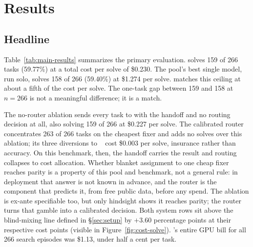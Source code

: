 \section{Results}
\label{sec:results}

\subsection{Headline}
\label{sec:results-headline}

\begin{table}[!tbp]
\centering
\caption{\textbf{Main results on SWE-bench Pro (Python-266).}
\sysname matches the pool's best single model (\fxopus) at about a fifth
of its cost per solve; 159 versus 158 is a one-task gap at $n{=}266$, a
match, not a win.  The last row is the no-router ablation, which ties
the routed system on this benchmark (\S\ref{sec:results-headline}).}
\label{tab:main-results}

\end{table}

Table~\ref{tab:main-results} summarizes the primary evaluation.
\sysname solves 159 of 266 tasks (59.77\%) at a total cost per solve of
\$0.230.  The pool's best single model, \fxopus run solo, solves 158 of
266 (59.40\%) at \$1.274 per solve.  \sysname matches this ceiling at
about a fifth of the cost per solve.  The one-task gap between 159 and
158 at $n{=}266$ is not a meaningful difference; it is a match.

The no-router ablation sends every task to \fxkimi with the handoff and
no routing decision at all, also solving 159 of 266 at \$0.227 per
solve.  The calibrated router concentrates 263 of 266 tasks on the
cheapest fixer and adds no solves over this ablation; its three
diversions to \fxflash~\citep{gemini3flash} cost \$0.003 per solve,
insurance rather than accuracy.  On this benchmark, then, the handoff
carries the result and routing collapses to cost allocation.  Whether
blanket assignment to one cheap fixer reaches parity is a property of
this pool and benchmark, not a general rule: in deployment that answer
is not known in advance, and the router is the component that predicts
it, from free public data, before any spend.  The ablation is ex-ante
specifiable too, but only hindsight shows it reaches parity; the router
turns that gamble into a calibrated decision.  Both
system rows sit above the blind-mixing line defined in
\S\ref{sec:setup} by $+$3.60 percentage points at their respective cost
points (visible in Figure~\ref{fig:cost-solve}).  \modelname's entire
GPU bill for all 266 search episodes was \$1.13, under half a cent per
task.

